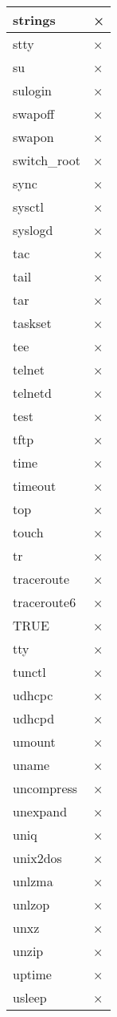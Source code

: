 \begin{longtable}{lp{50mm}}
strings & × \\ \hline
stty & × \\ \hline
su & × \\ \hline
sulogin & × \\ \hline
swapoff & × \\ \hline
swapon & × \\ \hline
switch_root & × \\ \hline
sync & × \\ \hline
sysctl & × \\ \hline
syslogd & × \\ \hline
tac & × \\ \hline
tail & × \\ \hline
tar & × \\ \hline
taskset & × \\ \hline
tee & × \\ \hline
telnet & × \\ \hline
telnetd & × \\ \hline
test & × \\ \hline
tftp & × \\ \hline
time & × \\ \hline
timeout & × \\ \hline
top & × \\ \hline
touch & × \\ \hline
tr & × \\ \hline
traceroute & × \\ \hline
traceroute6 & × \\ \hline
TRUE & × \\ \hline
tty & × \\ \hline
tunctl & × \\ \hline
udhcpc & × \\ \hline
udhcpd & × \\ \hline
umount & × \\ \hline
uname & × \\ \hline
uncompress & × \\ \hline
unexpand & × \\ \hline
uniq & × \\ \hline
unix2dos & × \\ \hline
unlzma & × \\ \hline
unlzop & × \\ \hline
unxz & × \\ \hline
unzip & × \\ \hline
uptime & × \\ \hline
usleep & × \\ \hline

\end{longtable}
